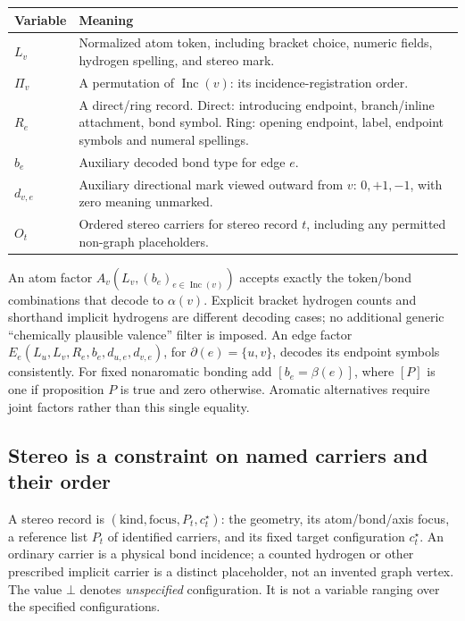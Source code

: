 \documentclass[11pt,a4paper]{article}
\newcommand{\Inc}{\operatorname{Inc}}
\newcommand{\ind}[1]{\left[#1\right]}
\newcommand{\none}{\bot}
\begin{document}
\begin{center}
\begin{tabularx}{\linewidth}{@{}lY@{}}
\toprule
Variable & Meaning\\
\midrule
\(L_v\) & Normalized atom token, including bracket choice, numeric fields, hydrogen spelling, and stereo mark.\\
\(\Pi_v\) & A permutation of \(\Inc(v)\): its incidence-registration order.\\
\(R_e\) & A direct/ring record. Direct: introducing endpoint, branch/inline attachment, bond symbol. Ring: opening endpoint, label, endpoint symbols and numeral spellings.\\
\(b_e\) & Auxiliary decoded bond type for edge \(e\).\\
\(d_{v,e}\) & Auxiliary directional mark viewed outward from \(v\): \(0,+1,-1\), with zero meaning unmarked.\\
\(O_t\) & Ordered stereo carriers for stereo record \(t\), including any permitted non-graph placeholders.\\
\bottomrule
\end{tabularx}
\end{center}

An atom factor
\(A_v(L_v,(b_e)_{e\in\Inc(v)})\) accepts exactly the token/bond combinations
that decode to \(\alpha(v)\). Explicit bracket hydrogen counts and shorthand
implicit hydrogens are different decoding cases; no additional generic
``chemically plausible valence'' filter is imposed. An edge factor
\(E_e(L_u,L_v,R_e,b_e,d_{u,e},d_{v,e})\), for \(\partial(e)=\{u,v\}\), decodes
its endpoint symbols consistently. For fixed nonaromatic bonding add
\(\ind{b_e=\beta(e)}\), where \(\ind{P}\) is one if proposition \(P\) is true and
zero otherwise. Aromatic alternatives require joint factors rather than this
single equality.\cite{opensmiles,note127}

\subsection{Stereo is a constraint on named carriers and their order}
A stereo record is
\((\mathrm{kind},\mathrm{focus},P_t,c_t^\star)\): the geometry, its atom/bond/axis
focus, a reference list \(P_t\) of identified carriers, and its fixed target
configuration \(c_t^\star\). An ordinary carrier is a physical bond incidence;
a counted hydrogen or other prescribed implicit carrier is a distinct
placeholder, not an invented graph vertex. The value \(\none\) denotes
\emph{unspecified} configuration. It is not a variable ranging over the specified
configurations.
\end{document}
